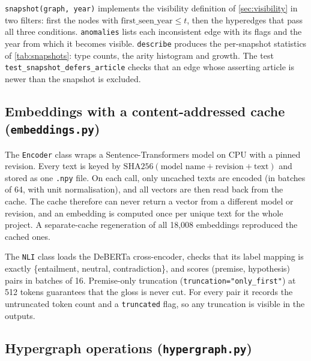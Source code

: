 \documentclass[11pt,a4paper]{article}
\newcommand{\cref}[1]{\autoref{#1}}
\theoremstyle{remark}
\newcommand{\code}[1]{\texttt{\small #1}}
\begin{document}
\code{snapshot(graph, year)} implements the visibility definition of \cref{sec:visibility}
in two filters: first the nodes with $\mathrm{first\_seen\_year}\le t$, then the hyperedges
that pass all three conditions. \code{anomalies} lists each inconsistent edge with its flags
and the year from which it becomes visible. \code{describe} produces the per-snapshot
statistics of \cref{tab:snapshots}: type counts, the arity histogram and growth. The test
\code{test\_snapshot\_defers\_article} checks that an edge whose asserting article is newer
than the snapshot is excluded.

\subsection{Embeddings with a content-addressed cache (\code{embeddings.py})}

The \code{Encoder} class wraps a Sentence-Transformers model on CPU with a pinned
revision. Every text is keyed by $\mathrm{SHA256}(\text{model name}+\text{revision}+\text{text})$
and stored as one \code{.npy} file. On each call, only uncached texts are encoded (in batches
of 64, with unit normalisation), and all vectors are then read back from the cache. The cache
therefore can never return a vector from a different model or revision, and an embedding
is computed once per unique text for the whole project. A separate-cache regeneration of all
18{,}008 embeddings reproduced the cached ones.

The \code{NLI} class loads the DeBERTa cross-encoder, checks that its label mapping is
exactly \{entailment, neutral, contradiction\}, and scores (premise, hypothesis) pairs in
batches of 16. Premise-only truncation (\code{truncation="only\_first"}) at 512 tokens
guarantees that the gloss is never cut. For every pair it records the untruncated token
count and a \code{truncated} flag, so any truncation is visible in the outputs.

\subsection{Hypergraph operations (\code{hypergraph.py})}
\end{document}
